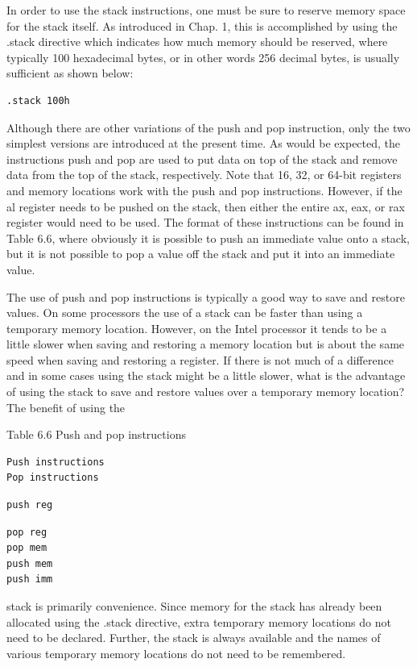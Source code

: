 \documentclass[10pt]{article}
\begin{document}
In order to use the stack instructions, one must be sure to reserve memory space for the stack itself. As introduced in Chap. 1, this is accomplished by using the .stack directive which indicates how much memory should be reserved, where typically 100 hexadecimal bytes, or in other words 256 decimal bytes, is usually sufficient as shown below:

\begin{verbatim}
.stack 100h
\end{verbatim}

Although there are other variations of the push and pop instruction, only the two simplest versions are introduced at the present time. As would be expected, the instructions push and pop are used to put data on top of the stack and remove data from the top of the stack, respectively. Note that 16, 32, or 64-bit registers and memory locations work with the push and pop instructions. However, if the al register needs to be pushed on the stack, then either the entire ax, eax, or rax register would need to be used. The format of these instructions can be found in Table 6.6, where obviously it is possible to push an immediate value onto a stack, but it is not possible to pop a value off the stack and put it into an immediate value.

The use of push and pop instructions is typically a good way to save and restore values. On some processors the use of a stack can be faster than using a temporary memory location. However, on the Intel processor it tends to be a little slower when saving and restoring a memory location but is about the same speed when saving and restoring a register. If there is not much of a difference and in some cases using the stack might be a little slower, what is the advantage of using the stack to save and restore values over a temporary memory location? The benefit of using the

Table 6.6 Push and pop instructions

\begin{verbatim}
Push instructions
Pop instructions
\end{verbatim}

\begin{verbatim}
push reg
\end{verbatim}

\begin{verbatim}
pop reg
pop mem
push mem
push imm
\end{verbatim}

stack is primarily convenience. Since memory for the stack has already been allocated using the .stack directive, extra temporary memory locations do not need to be declared. Further, the stack is always available and the names of various temporary memory locations do not need to be remembered.
\end{document}
